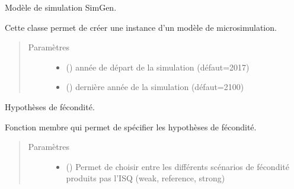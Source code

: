 \documentclass[letterpaper,10pt,french]{sphinxmanual}
\begin{document}
\begin{fulllineitems}
\label{\detokenize{code:simgen.model}}
Modèle de simulation SimGen.

Cette classe permet de créer une instance d’un modèle de microsimulation.
\begin{quote}\begin{description}
\item[{Paramètres}] \leavevmode\begin{itemize}
\item {} 
 () \textendash{} année de départ de la simulation (défaut=2017)

\item {} 
 () \textendash{} dernière année de la simulation (défaut=2100)

\end{itemize}

\end{description}\end{quote}

\begin{fulllineitems}
\label{\detokenize{code:simgen.model.birth_assumptions}}
Hypothèses de fécondité.

Fonction membre qui permet de spécifier les hypothèses de fécondité.
\begin{quote}\begin{description}
\item[{Paramètres}] \leavevmode\begin{itemize}
\item {} 
 () \textendash{} Permet de choisir entre les différents scénarios de fécondité produits pas l’ISQ (weak, reference, strong)


\end{itemize}
\end{description}
\end{quote}
\end{fulllineitems}
\end{fulllineitems}
\end{document}
